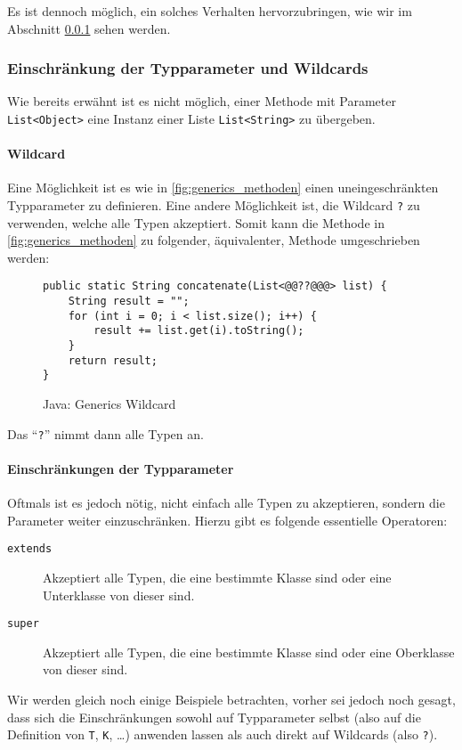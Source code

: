 		Es ist dennoch möglich, ein solches Verhalten hervorzubringen, wie wir im Abschnitt \ref{sec:generics_restriction} sehen werden.
	
	\subsubsection{Einschränkung der Typparameter und Wildcards}
		\label{sec:generics_restriction}
	
		Wie bereits erwähnt ist es nicht möglich, einer Methode mit Parameter \texttt{List<Object>} eine Instanz einer Liste \texttt{List<String>} zu übergeben.
		
		\paragraph{Wildcard}
			Eine Möglichkeit ist es wie in \ref{fig:generics_methoden} einen uneingeschränkten Typparameter zu definieren. Eine andere Möglichkeit ist, die Wildcard \texttt{?} zu verwenden, welche alle Typen akzeptiert. Somit kann die Methode in \ref{fig:generics_methoden} zu folgender, äquivalenter, Methode umgeschrieben werden:
			\begin{figure}[H]
				\centering
				\begin{lstlisting}[style = base]
public static String concatenate(List<@@??@@@> list) {
	String result = "";
	for (int i = 0; i < list.size(); i++) {
		result += list.get(i).toString();
	}
	return result;
}
				\end{lstlisting}
				\caption{Java: Generics Wildcard}
			\end{figure}
			Das \enquote{\texttt{?}} nimmt dann alle Typen an.
		
		\paragraph{Einschränkungen der Typparameter}
			Oftmals ist es jedoch nötig, nicht einfach alle Typen zu akzeptieren, sondern die Parameter weiter einzuschränken. Hierzu gibt es folgende essentielle Operatoren:
			\begin{description}
				\item[\texttt{extends}] Akzeptiert alle Typen, die eine bestimmte Klasse sind oder eine Unterklasse von dieser sind.
				\item[\texttt{super}] Akzeptiert alle Typen, die eine bestimmte Klasse sind oder eine Oberklasse von dieser sind.
			\end{description}
			Wir werden gleich noch einige Beispiele betrachten, vorher sei jedoch noch gesagt, dass sich die Einschränkungen sowohl auf Typparameter selbst (also auf die Definition von \texttt{T}, \texttt{K}, \dots) anwenden lassen als auch direkt auf Wildcards (also \texttt{?}).
			
